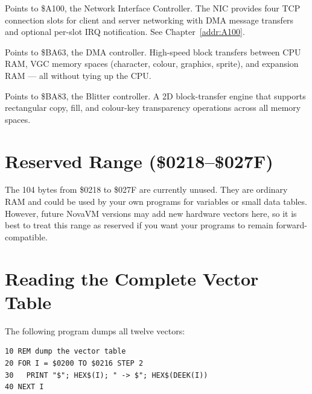 Points to \$A100, the Network Interface Controller.  The NIC provides four
TCP connection slots for client and server networking with DMA message
transfers and optional per-slot IRQ notification.
See Chapter~\ref{addr:A100}.



Points to \$BA63, the DMA controller.  High-speed block transfers between
CPU RAM, VGC memory spaces (character, colour, graphics, sprite), and
expansion RAM --- all without tying up the CPU.



Points to \$BA83, the Blitter controller.  A 2D block-transfer engine that
supports rectangular copy, fill, and colour-key transparency operations
across all memory spaces.

\section{Reserved Range (\$0218--\$027F)}

The 104 bytes from \$0218 to \$027F are currently unused.  They are ordinary
RAM and could be used by your own programs for variables or small data tables.
However, future NovaVM versions may add new hardware vectors here, so it is
best to treat this range as reserved if you want your programs to remain
forward-compatible.

\section{Reading the Complete Vector Table}

The following program dumps all twelve vectors:

\begin{lstlisting}
10 REM dump the vector table
20 FOR I = $0200 TO $0216 STEP 2
30   PRINT "$"; HEX$(I); " -> $"; HEX$(DEEK(I))
40 NEXT I
\end{lstlisting}

